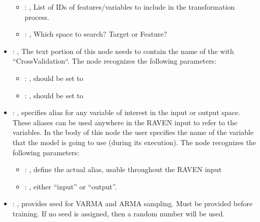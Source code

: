 \begin{itemize}
\begin{itemize}
        \item {}: ,
          List of IDs of features/variables to include in the transformation process.

        \item {}: ,
          Which space to search? Target or Feature?
      \end{itemize}

    \item {}: ,
      The text portion of this node needs to contain the name of the  with
               ``CrossValidation``.
      The  node recognizes the following parameters:
        \begin{itemize}
          \item {}: ,
            should be set to 
          \item {}: ,
            should be set to 
      \end{itemize}

    \item {}: ,
      specifies alias for         any variable of interest in the input or output space. These
      aliases can be used anywhere in the RAVEN input to         refer to the variables. In the body
      of this node the user specifies the name of the variable that the model is going to use
      (during its execution).
      The  node recognizes the following parameters:
        \begin{itemize}
          \item {}: ,
            define the actual alias, usable throughout the RAVEN input
          \item {}: ,
            either ``input'' or ``output''.
      \end{itemize}

    \item {}: ,
      provides seed for VARMA and ARMA sampling.
      Must be provided before training. If no seed is assigned,
      then a random number will be used.


\end{itemize}
